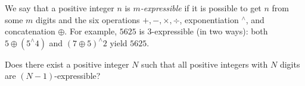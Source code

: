 We say that a positive integer $n$ is $m$\textit{-expressible} if it is possible to get $n$ from some $m$ digits and the six operations $+,-,\times,\div$, exponentiation $^\wedge$, and concatenation $\oplus$. For example, $5625$ is $3$-expressible (in two ways): both $5\oplus (5^\wedge 4)$ and $(7\oplus 5)^\wedge 2$ yield $5625$.

Does there exist a positive integer $N$ such that all positive integers with $N$ digits are $(N-1)$-expressible?

